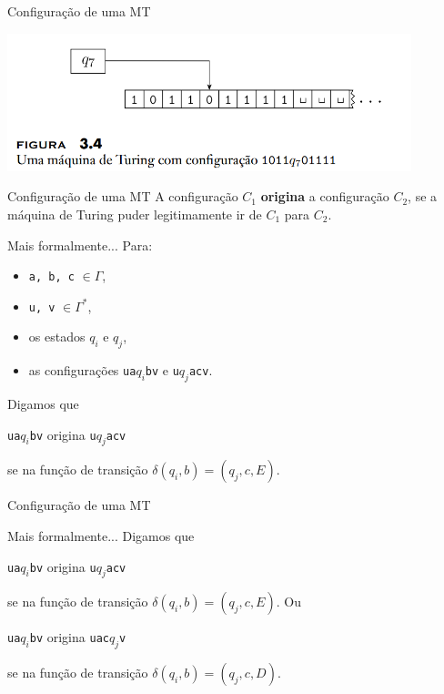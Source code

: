 \documentclass[xcolor=dvipsnames,table]{beamer}
\begin{document}
	\begin{frame}{Configuração de uma MT}
		\begin{center}
			\includegraphics[height=4cm]{images/fig34.png}
		\end{center}
	\end{frame}
	
	\begin{frame}{Configuração de uma MT}
		A configuração $C_1$ {\bf origina} a configuração $C_2$, se a máquina de Turing puder legitimamente ir de $C_1$ para $C_2$.
		\begin{block}{Mais formalmente...}					Para:
			\begin{itemize}
				\item {\tt a, b, c} $\in \Gamma$,
				\item {\tt u, v} $\in \Gamma^*$, 
				\item os estados $q_i$ e $q_j$, 
				\item as configurações {\tt ua}$q_i${\tt bv} e {\tt u}$q_j${\tt acv}.
			\end{itemize}
			\pause	
			Digamos que 
			\begin{center}
				{\tt ua}$q_i${\tt bv} origina {\tt u}$q_j${\tt acv} 
			\end{center} 
			se na função de transição $\delta(q_i, b) = (q_j, c, E)$.
		\end{block}
	\end{frame}
	
	\begin{frame}{Configuração de uma MT}
		\begin{block}{Mais formalmente...}
			Digamos que 
			\begin{center}
				{\tt ua}$q_i${\tt bv} origina {\tt u}$q_j${\tt acv} 
			\end{center} 
			se na função de transição $\delta(q_i, b) = (q_j, c, E)$. Ou
			\begin{center}
				{\tt ua}$q_i${\tt bv} origina {\tt uac}$q_j${\tt v} 
			\end{center} 
			se na função de transição $\delta(q_i, b) = (q_j, c, D)$.
		\end{block}
	\end{frame}
	
\end{document}

